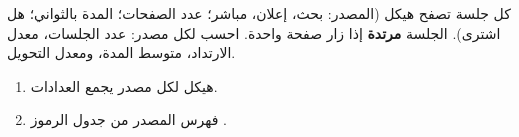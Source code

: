 \begin{statement}
كل جلسة تصفح هيكل  (المصدر:  بحث،  إعلان،  مباشر؛ عدد الصفحات؛ المدة بالثواني؛ هل اشترى). الجلسة \textbf{مرتدة} إذا زار صفحة واحدة. احسب لكل مصدر: عدد الجلسات، معدل الارتداد، متوسط المدة، ومعدل التحويل.
\end{statement}
\begin{stepsbox}\begin{enumerate}
\item هيكل  لكل مصدر يجمع العدادات.
\item فهرس المصدر من جدول الرموز .
\end{enumerate}\end{stepsbox}
